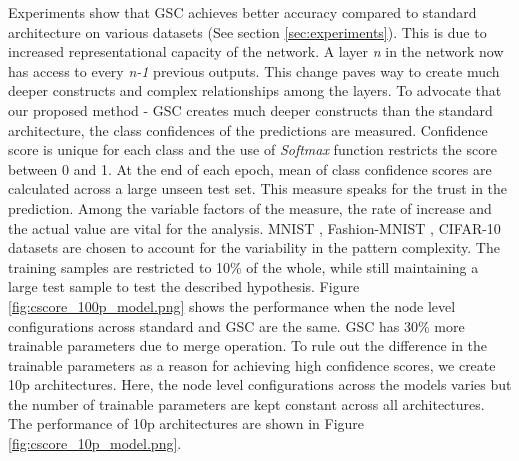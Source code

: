 \documentclass{article}
\begin{document}
Experiments show that GSC achieves better accuracy compared to standard architecture on various datasets (See section \ref{sec:experiments}). This is due to increased representational capacity of the network. A layer \emph{n} in the network now has access to every \emph{n-1} previous outputs. This change paves way to create much deeper constructs and complex relationships among the layers. To advocate that our proposed method - GSC creates much deeper constructs than the standard architecture, the class confidences of the predictions are measured. Confidence score is unique for each class and the use of \emph{Softmax} function restricts the score between 0 and 1. At the end of each epoch, mean of class confidence scores are calculated across a large unseen test set. This measure speaks for the trust in the prediction. Among the variable factors of the measure, the rate of increase and the actual value are vital for the analysis. MNIST \cite{LeCun1998GradientbasedLA}, Fashion-MNIST \cite{Xiao2017FashionMNISTAN}, CIFAR-10 datasets \cite{Krizhevsky2009LearningML} are chosen to account for the variability in the pattern complexity. The training samples are restricted to 10\% of the whole, while still maintaining a large test sample to test the described hypothesis. Figure \ref{fig:cscore_100p_model.png} shows the performance when the node level configurations across standard and GSC are the same. GSC has 30\% more trainable parameters due to merge operation. To rule out the difference in the trainable parameters as a reason for achieving high confidence scores, we create 10p architectures. Here, the node level configurations across the models varies but the number of trainable parameters are kept constant across all architectures. The performance of 10p architectures are shown in Figure \ref{fig:cscore_10p_model.png}.  
\end{document}
